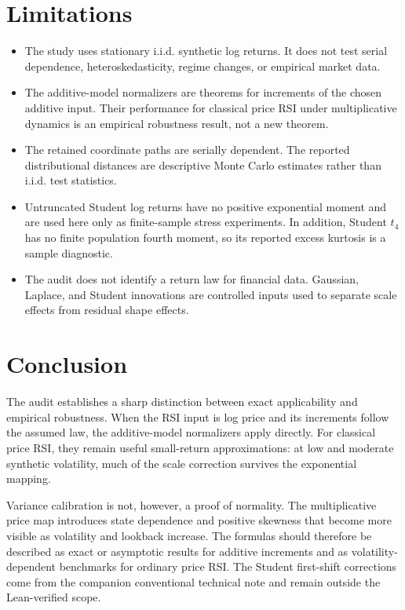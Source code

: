 \documentclass[10pt]{article}
\begin{document}
\section{Limitations}

\begin{itemize}
\item The study uses stationary i.i.d. synthetic log returns.  It does not test
      serial dependence, heteroskedasticity, regime changes, or empirical
      market data.
\item The additive-model normalizers are theorems for increments of the chosen
      additive input.  Their performance for classical price RSI under
      multiplicative dynamics is an empirical robustness result, not a new
      theorem.
\item The retained coordinate paths are serially dependent.  The reported
      distributional distances are descriptive Monte Carlo estimates rather
      than i.i.d. test statistics.
\item Untruncated Student log returns have no positive exponential moment and
      are used here only as finite-sample stress experiments.  In addition,
      Student $t_4$ has no finite population fourth moment, so its reported
      excess kurtosis is a sample diagnostic.
\item The audit does not identify a return law for financial data.  Gaussian,
      Laplace, and Student innovations are controlled inputs used to separate
      scale effects from residual shape effects.
\end{itemize}

\section{Conclusion}

The audit establishes a sharp distinction between exact applicability and
empirical robustness.  When the RSI input is log price and its increments
follow the assumed law, the additive-model normalizers apply directly.  For
classical price RSI, they remain useful small-return approximations: at low and
moderate synthetic volatility, much of the scale correction survives the
exponential mapping.

Variance calibration is not, however, a proof of normality.  The multiplicative
price map introduces state dependence and positive skewness that become more
visible as volatility and lookback increase.  The formulas should therefore be
described as exact or asymptotic results for additive increments and as
volatility-dependent benchmarks for ordinary price RSI.  The Student
first-shift corrections come from the companion conventional technical note
and remain outside the Lean-verified scope.
\end{document}
